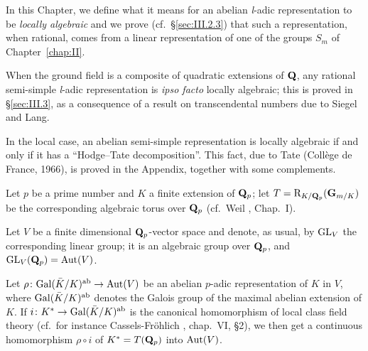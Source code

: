 
In this Chapter, we define what it means for an abelian \textit{l}-adic
representation to be \emph{locally algebraic} and we prove
(cf.~\S\ref{sec:III.2.3}) that such a representation, when rational,
comes from a linear representation of one of the groups $S_m$ of
Chapter~\ref{chap:II}.

When the ground field is a composite of quadratic extensions of $\mathbf{Q}$,
any rational semi-simple \textit{l}-adic representation is \emph{ipso
facto} locally algebraic; this is proved in \S\ref{sec:III.3}, as a
consequence of a result on transcendental numbers due to Siegel and
Lang.

In the local case, an abelian semi-simple representation is locally
algebraic if and only if it has a ``Hodge--Tate decomposition''.  This
fact, due to Tate (Collège de France, 1966), is proved in the Appendix,
together with some complements.



Let $p$ be a prime number and $K$ a finite extension of $\mathbf{Q}_p$; let
$T = \mathrm{R}_{K/\mathbf{Q}_p}(\mathbf{G}_{m/K})$ be the corresponding
algebraic torus over $\mathbf{Q}_p$ (cf.~Weil \cite{weil-adeles}, Chap.~I).

Let $V$ be a finite dimensional $\mathbf{Q}_p$-vector space and denote, as
usual, by $\mathrm{GL}_V$ the corresponding linear group; it is an algebraic
group over $\mathbf{Q}_p$, and $\mathrm{GL}_V(\mathbf{Q}_p) = \mathrm{Aut}(V)$.

Let $\rho\colon \mathrm{Gal}(\bar K/K)^{\mathrm{ab}} \to \mathrm{Aut}(V)$ be an abelian
$p$-adic representation of $K$ in $V$, where
$\mathrm{Gal}(\bar K/K)^{\mathrm{ab}}$ denotes the Galois group of the maximal
abelian extension of $K$.  If
$i\colon K^* \to \mathrm{Gal}(\bar K/K)^{\mathrm{ab}}$ is the canonical
homomorphism of local class field theory (cf.~for instance
Cassels-Fröhlich \cite{cassels-frohlich}, chap.~VI, \S2), we then get a
continuous homomorphism $\rho\circ i$ of $K^* = T(\mathbf{Q}_p)$ into
$\mathrm{Aut}(V)$.

